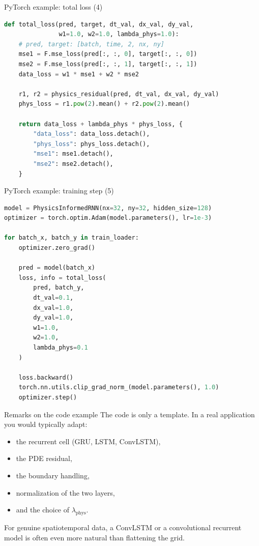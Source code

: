 \documentclass[aspectratio=169]{beamer}
\begin{document}
\begin{frame}[fragile]{PyTorch example: total loss (4)}
\begin{lstlisting}[language=Python]
def total_loss(pred, target, dt_val, dx_val, dy_val,
               w1=1.0, w2=1.0, lambda_phys=1.0):
    # pred, target: [batch, time, 2, nx, ny]
    mse1 = F.mse_loss(pred[:, :, 0], target[:, :, 0])
    mse2 = F.mse_loss(pred[:, :, 1], target[:, :, 1])
    data_loss = w1 * mse1 + w2 * mse2

    r1, r2 = physics_residual(pred, dt_val, dx_val, dy_val)
    phys_loss = r1.pow(2).mean() + r2.pow(2).mean()

    return data_loss + lambda_phys * phys_loss, {
        "data_loss": data_loss.detach(),
        "phys_loss": phys_loss.detach(),
        "mse1": mse1.detach(),
        "mse2": mse2.detach(),
    }
\end{lstlisting}
\end{frame}

\begin{frame}[fragile]{PyTorch example: training step (5)}
\begin{lstlisting}[language=Python]
model = PhysicsInformedRNN(nx=32, ny=32, hidden_size=128)
optimizer = torch.optim.Adam(model.parameters(), lr=1e-3)

for batch_x, batch_y in train_loader:
    optimizer.zero_grad()

    pred = model(batch_x)
    loss, info = total_loss(
        pred, batch_y,
        dt_val=0.1,
        dx_val=1.0,
        dy_val=1.0,
        w1=1.0,
        w2=1.0,
        lambda_phys=0.1
    )

    loss.backward()
    torch.nn.utils.clip_grad_norm_(model.parameters(), 1.0)
    optimizer.step()
\end{lstlisting}
\end{frame}

\begin{frame}{Remarks on the code example}
The code is only a template. In a real application you would typically adapt:
\begin{itemize}
\item the recurrent cell (GRU, LSTM, ConvLSTM),
\item the PDE residual,
\item the boundary handling,
\item normalization of the two layers,
\item and the choice of \(\lambda_{\mathrm{phys}}\).
\end{itemize}

For genuine spatiotemporal data, a ConvLSTM or a convolutional recurrent model is often even more natural than flattening the grid.
\end{frame}
\end{document}
